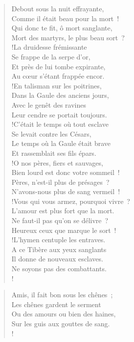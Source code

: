 \documentclass[french,twoside]{book} %
\newenvironment{quoteblock}%
  {\begin{quoting}}
  {\end{quoting}}
\newenvironment{quotebar}{%
    \def\FrameCommand{{\color{rubric!10!}\vrule width 0.5em} \hspace{0.9em}}%
    \def\OuterFrameSep{\itemsep} %
    \MakeFramed {\advance\hsize-\width \FrameRestore}
  }%
  {%
    \endMakeFramed
  }
\renewenvironment{quoteblock}%
  {%
    \savenotes
    \setstretch{0.9}
    \normalfont
    \begin{quotebar}
  }
  {%
    \end{quotebar}
    \spewnotes
  }
\begin{document}
\begin{verse}
Debout sous la nuit effrayante,\\
Comme il était beau pour la mort !\\
Qui donc te fit, ô mort sanglante,\\
Mort des martyrs, le plus beau sort ?\\!La druidesse frémissante\\
Se frappe de la serpe d’or,\\
Et près de lui tombe expirante,\\
Au cœur s’étant frappée encor.\\!En talisman sur les poitrines,\\
Dans la Gaule des anciens jours,\\
Avec le genêt des ravines\\
Leur cendre se portait toujours.\\!C’était le temps où tout esclave\\
Se levait contre les Césars,\\
Le temps où la Gaule était brave\\
Et rassemblait ses fils épars.\\!O nos pères, fiers et sauvages,\\
Bien lourd est donc votre sommeil !\\
Pères, n’est-il plus de présages ?\\
N’avons-nous plus de sang vermeil !\\!Vous qui vous armez, pourquoi vivre ?\\
L’amour est plus fort que la mort.\\
Ne faut-il pas qu’on se délivre ?\\
Heureux ceux que marque le sort !\\!L’hymen centuple les entraves.\\
A ce Tibère aux yeux sanglants\\
Il donne de nouveaux esclaves.\\
Ne soyons pas des combattants.\\!
\end{verse}
\begin{quoteblock}
 \end{quoteblock}

\begin{verse}
Amis, il fait bon sous les chênes ;\\
Les chênes gardent le serment\\
Ou des amours ou bien des haines,\\
Sur les guis aux gouttes de sang.\\!
\end{verse}
\end{document}

